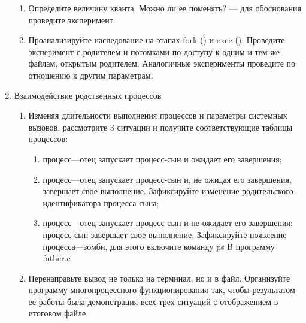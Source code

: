 \documentclass[a4paper]{article}
\begin{document}
\begin{enumerate}
\begin{enumerate}
		\item Определите величину кванта. Можно ли ее поменять? — для обоснования проведите эксперимент.

		\item Проанализируйте наследование на этапах fork () и exec (). Проведите эксперимент с родителем и потомками по доступу к одним и тем же файлам, открытым родителем. Аналогичные эксперименты 
проведите по отношению к другим параметрам. 

	\end{enumerate}
	\item Взаимодействие родственных процессов
	\begin{enumerate}
		\item Изменяя длительности выполнения процессов и параметры системных вызовов, рассмотрите 3 ситуации и получите соответствующие таблицы процессов:
		\begin{enumerate}
			\item процесс—отец запускает процесс-сын и ожидает его завершения;
			\item процесс—отец запускает процесс-сын и, не ожидая его завершения, завершает свое выполнение. Зафиксируйте изменение родительского идентификатора процесса-сына;

			\item процесс—отец запускает процесс-сын и не ожидает его завершения; процесс-сын завершает свое выполнение. Зафиксируйте появление процесса—зомби, для этого включите команду ps B программу father.c	
		\end{enumerate}
		\item Перенаправьте вывод не только на терминал, но и в файл. Организуйте программу многопроцессного функционирования так, чтобы результатом ее работы была демонстрация всех трех ситуаций с отображением в итоговом файле.
		
	\end{enumerate}	
	

\end{enumerate}
\end{document}
